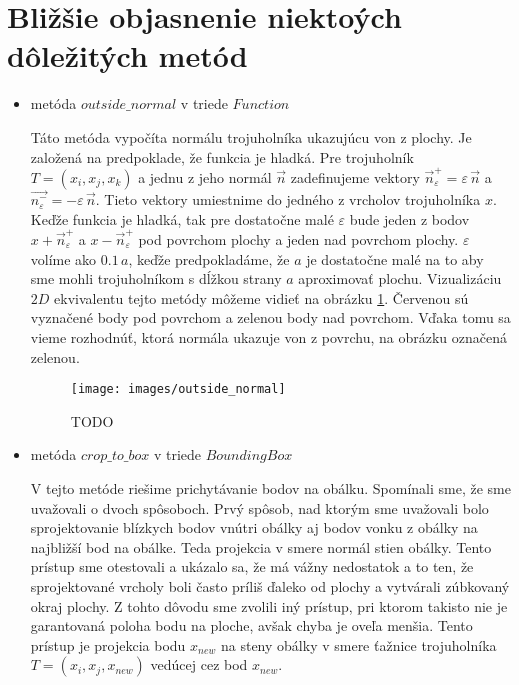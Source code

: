 \section{Bližšie objasnenie niektoých dôležitých metód}
\begin{itemize}
    \item{
        metóda $outside\_normal$ v triede $Function$
        
        Táto metóda vypočíta normálu trojuholníka ukazujúcu von z plochy.
        Je založená na predpoklade, že funkcia je hladká. Pre trojuholník
        $T = (x_i, x_j, x_k)$ a jednu z jeho normál $\overrightarrow{n}$
        zadefinujeme vektory $\overrightarrow{n}_{\varepsilon}^+ = \varepsilon \, \overrightarrow{n}$
        a $\overrightarrow{n_{\varepsilon}^-} = - \varepsilon \, \overrightarrow{n}$.
        Tieto vektory umiestnime do jedného z vrcholov trojuholníka $x$.
        Keďže funkcia je hladká, tak pre dostatočne malé $\varepsilon$ bude jeden z
        bodov $x + \overrightarrow{n}_{\varepsilon}^+$ a $x - \overrightarrow{n}_{\varepsilon}^+$ 
        pod povrchom plochy a jeden nad povrchom plochy. 
        $\varepsilon$ volíme ako $0.1 \, a$, keďže predpokladáme, že $a$ je dostatočne 
        malé na to aby sme mohli trojuholníkom s dĺžkou strany $a$ aproximovať plochu.
        Vizualizáciu $2D$ ekvivalentu tejto metódy môžeme vidieť na obrázku \ref{obr:outside_normal}.
        Červenou sú vyznačené body pod povrchom a zelenou body nad povrchom. Vďaka tomu sa vieme 
        rozhodnúť, ktorá normála ukazuje von z povrchu, na obrázku označená zelenou.

        \begin{figure}
            \centerline{\texttt{[image: images/outside\_normal]}}
            \caption[TODO]{TODO}
            \label{obr:outside_normal}
        \end{figure}
    }
    \item{

        metóda $crop\_to\_box$ v triede $BoundingBox$
        
        V tejto metóde riešime prichytávanie bodov na obálku.
        Spomínali sme, že sme uvažovali o dvoch spôsoboch.
        Prvý spôsob, nad ktorým sme uvažovali bolo sprojektovanie blízkych bodov vnútri obálky aj 
        bodov vonku z obálky na najbližší bod na obálke. Teda projekcia v smere normál stien obálky.
        Tento prístup sme otestovali a ukázalo sa, že má vážny nedostatok a to ten, že sprojektované 
        vrcholy boli často príliš ďaleko od plochy a vytvárali zúbkovaný okraj plochy. Z tohto dôvodu
        sme zvolili iný prístup, pri ktorom takisto nie je garantovaná poloha bodu na ploche, avšak 
        chyba je oveľa menšia. Tento prístup je projekcia bodu $x_{new}$ na steny obálky v smere 
        ťažnice trojuholníka $T = (x_i, x_j, x_{new})$ vedúcej cez bod $x_{new}$.

}
\end{itemize}
